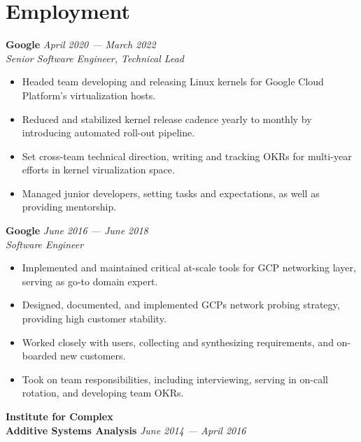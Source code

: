 \documentclass{tc_cv}
\begin{document}
\hfill\vline\hfill
\begin{minipage}[t]{0.6\linewidth}
\section{Employment}
\textbf{Google} \hfill \textsl{April 2020 --- March 2022}\\
\textsl{Senior Software Engineer, Technical Lead}
\nopagebreak
\begin{itemize}
  \item Headed team developing and releasing Linux kernels for Google Cloud
    Platform's virtualization hosts.
  \item Reduced and stabilized kernel release cadence yearly to monthly by
    introducing automated roll-out pipeline.
  \item Set cross-team technical direction, writing and tracking OKRs for
    multi-year efforts in kernel virualization space.
  \item Managed junior developers, setting tasks and expectations, as well as
    providing mentorship.
\end{itemize}
\vspace{1em}
\textbf{Google} \hfill \textsl{June 2016 --- June 2018}\\
\textsl{Software Engineer}
\nopagebreak
\begin{itemize}
  \item Implemented and maintained critical at-scale tools for GCP
    networking layer, serving as go-to domain expert.
  \item Designed, documented, and implemented GCPs network probing strategy,
    providing high customer stability.
  \item Worked closely with users, collecting and synthesizing requirements,
    and on-boarded new customers.
  \item Took on team responsibilities, including interviewing, serving in
    on-call rotation, and developing team OKRs.
\end{itemize}
\vspace{1em}
\textbf{Institute for Complex \\ Additive Systems Analysis} \hfill \textsl{June 2014 --- April 2016}\\

\end{minipage}
\end{document}
